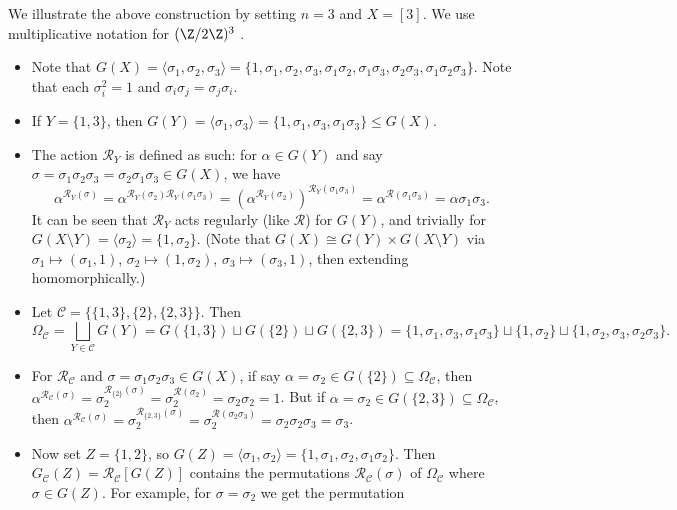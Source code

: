 \begin{example}\label{eg:blaha_elem_technical_construction_example}
    We illustrate the above construction by setting $n = 3$ and $X = [3]$. We use multiplicative notation for $(\Z/2\Z)^3$ .
    \begin{itemize}
        \item Note that $G(X) = \langle\sigma_1,\sigma_2,\sigma_3\rangle = \{1,\sigma_1,\sigma_2,\sigma_3,\sigma_1\sigma_2,\sigma_1\sigma_3,\sigma_2\sigma_3,\sigma_1\sigma_2\sigma_3\}$. Note that each $\sigma_i^2 = 1$ and $\sigma_i\sigma_j = \sigma_j\sigma_i$.
        \item If $Y = \{1,3\}$, then $G(Y) = \langle\sigma_1,\sigma_3\rangle = \{1,\sigma_1,\sigma_3,\sigma_1\sigma_3\} \leq G(X)$.
        \item The action $\mathcal{R}_Y$ is defined as such: for $\alpha \in G(Y)$ and say $\sigma = \sigma_1\sigma_2\sigma_3 = \sigma_2\sigma_1\sigma_3 \in G(X)$, we have
              $$\alpha^{\mathcal{R}_Y(\sigma)} = \alpha^{\mathcal{R}_Y(\sigma_2)\mathcal{R}_Y(\sigma_1\sigma_3)} = (\alpha^{\mathcal{R}_Y(\sigma_2)})^{\mathcal{R}_Y(\sigma_1\sigma_3)} = \alpha^{\mathcal{R}(\sigma_1\sigma_3)} = \alpha\sigma_1\sigma_3.$$
              It can be seen that $\mathcal{R}_Y$ acts regularly (like $\mathcal{R}$) for $G(Y)$, and trivially for $G(X \setminus Y) = \langle\sigma_2\rangle = \{1,\sigma_2\}$. (Note that $G(X) \cong G(Y) \times G(X \setminus Y)$ via $\sigma_1 \mapsto (\sigma_1,1)$, $\sigma_2 \mapsto (1,\sigma_2)$, $\sigma_3 \mapsto (\sigma_3,1)$, then extending homomorphically.)
        \item Let $\mathcal{C} = \{\{1,3\},\{2\},\{2,3\}\}$. Then
              $$\Omega_{\mathcal{C}} = \bigsqcup_{Y \in \mathcal{C}} G(Y) = G(\{1,3\}) \sqcup G(\{2\}) \sqcup G(\{2,3\}) = \{1,\sigma_1,\sigma_3,\sigma_1\sigma_3\} \sqcup \{1,\sigma_2\} \sqcup \{1,\sigma_2,\sigma_3,\sigma_2\sigma_3\}.$$
        \item For $\mathcal{R}_\mathcal{C}$ and $\sigma = \sigma_1\sigma_2\sigma_3 \in G(X)$, if say $\alpha = \sigma_2 \in G(\{2\}) \subseteq \Omega_\mathcal{C}$, then $\alpha^{\mathcal{R}_\mathcal{C}(\sigma)} = \sigma_2^{\mathcal{R}_{\{2\}}(\sigma)} = \sigma_2^{\mathcal{R}(\sigma_2)} = \sigma_2\sigma_2 = 1$. But if $\alpha = \sigma_2 \in G(\{2,3\}) \subseteq \Omega_\mathcal{C}$, then $\alpha^{\mathcal{R}_\mathcal{C}(\sigma)} = \sigma_2^{\mathcal{R}_{\{2,3\}}(\sigma)} = \sigma_2^{\mathcal{R}(\sigma_2\sigma_3)} = \sigma_2\sigma_2\sigma_3 = \sigma_3$.
        \item Now set $Z = \{1,2\}$, so $G(Z) = \langle\sigma_1,\sigma_2\rangle = \{1,\sigma_1,\sigma_2,\sigma_1\sigma_2\}$. Then $G_\mathcal{C}(Z) = \mathcal{R}_\mathcal{C}[G(Z)]$ contains the permutations $\mathcal{R}_\mathcal{C}(\sigma)$ of $\Omega_\mathcal{C}$ where $\sigma \in G(Z)$. For example, for $\sigma = \sigma_2$ we get the permutation

\end{itemize}
\end{example}
